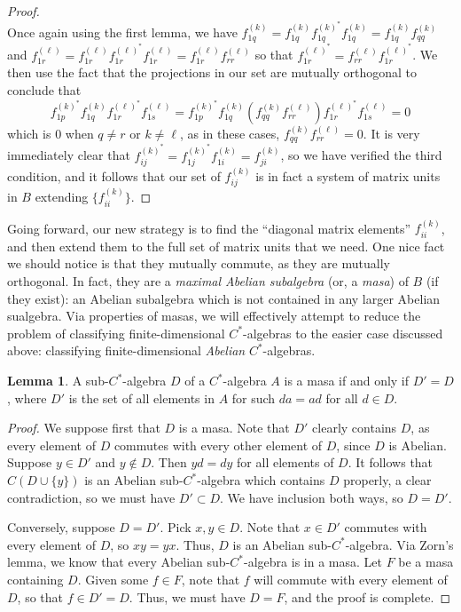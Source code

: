 \documentclass[aps,pra,showpacs,notitlepage,onecolumn,superscriptaddress,nofootinbib]{revtex4-1}
\theoremstyle{definition}
\newtheorem{lemma}{Lemma}[section]
\begin{document}
\begin{proof}
\begin{equation}
  \end{equation}
  Once again using the first lemma, we have $f_{1q}^{(k)} = f_{1q}^{(k)} f_{1q}^{(k)^{*}} f_{1q}^{(k)} =  f_{1q}^{(k)}  f_{qq}^{(k)}$ and $f_{1r}^{(\ell)} = f_{1r}^{(\ell)} f_{1r}^{(\ell)^{*}} f_{1r}^{(\ell)} =  f_{1r}^{(\ell)} f_{rr}^{(\ell)}$
  so that $f_{1r}^{(\ell)^{*}} = f_{rr}^{(\ell)} f_{1r}^{(\ell)^{*}}$. We then use the fact that the projections in our set are mutually orthogonal to conclude that
  \begin{equation}
    f_{1p}^{(k)^{*}} f_{1q}^{(k)} f_{1r}^{(\ell)^{*}} f_{1s}^{(\ell)} = f_{1p}^{(k)^{*}} f_{1q}^{(k)} (f_{qq}^{(k)}  f_{rr}^{(\ell)}) f_{1r}^{(\ell)^{*}} f_{1s}^{(\ell)} = 0
  \end{equation}
  which is $0$ when $q \neq r$ or $k \neq \ell$, as in these cases, $f_{qq}^{(k)}  f_{rr}^{(\ell)} = 0$. It is very immediately clear that $f_{ij}^{(k)^{*}} = f_{1j}^{(k)^{*}} f_{1i}^{(k)} = f_{ji}^{(k)}$,
  so we have verified the third condition, and it follows that our set of $f_{ij}^{(k)}$ is in fact a system of matrix units in $B$ extending $\{f_{ii}^{(k)}\}$.
\end{proof}

\noindent Going forward, our new strategy is to find the ``diagonal matrix elements'' $f_{ii}^{(k)}$, and then extend them to the full
set of matrix units that we need. One nice fact we should notice is that they mutually commute, as they are mutually orthogonal. In fact, they
are a \emph{maximal Abelian subalgebra} (or, a \emph{masa}) of $B$ (if they exist): an Abelian subalgebra which is not contained in any larger Abelian sualgebra.
Via properties of masas, we will effectively attempt to reduce the problem of classifying finite-dimensional $C^{*}$-algebras to the easier case discussed above: classifying
finite-dimensional \emph{Abelian} $C^{*}$-algebras.

\begin{lemma}
  A sub-$C^{*}$-algebra $D$ of a $C^{*}$-algebra $A$ is a masa if and only if $D' = D$, where $D'$ is the set of all elements in $A$ for such $da = ad$ for all $d \in D$.
\end{lemma}
\begin{proof}
  We suppose first that $D$ is a masa. Note that $D'$ clearly contains $D$, as every element of $D$ commutes with every other element of $D$, since $D$ is Abelian.
  Suppose $y \in D'$ and $y \notin D$. Then $yd = dy$ for all elements of $D$. It follows that $C(D \cup \{y\})$ is an Abelian sub-$C^{*}$-algebra which contains $D$ properly,
  a clear contradiction, so we must have $D' \subset D$. We have inclusion both ways, so $D = D'$.

  Conversely, suppose $D = D'$. Pick $x, y \in D$. Note that $x \in D'$ commutes with every element of $D$, so $xy = yx$. Thus, $D$ is an Abelian sub-$C^{*}$-algebra. Via Zorn's lemma,
  we know that every Abelian sub-$C^{*}$-algebra is in a masa. Let $F$ be a masa containing $D$. Given some $f \in F$, note that $f$ will commute with every element of $D$, so that $f \in D' = D$. Thus,
  we must have $D = F$, and the proof is complete.
\end{proof}
\end{document}
